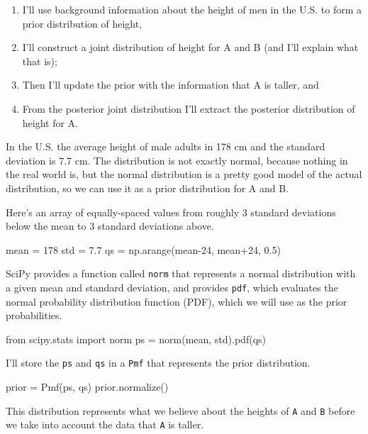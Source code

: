 \documentclass[12pt]{book}
\theoremstyle{exercise}
\newcommand{\py}[1]{{\tt #1}}%
\begin{document}
\begin{enumerate}

\item I'll use background information about the height of men in the U.S. to form a prior distribution of height,

\item I'll construct a joint distribution of height for A and B (and I'll explain what that is);

\item Then I'll update the prior with the information that A is taller, and

\item From the posterior joint distribution I'll extract the posterior distribution of height for A.

\end{enumerate}

In the U.S. the average height of male adults in 178 cm and the standard deviation is 7.7 cm.  The distribution is not exactly normal, because nothing in the real world is, but the normal distribution is a pretty good model of the actual distribution, so we can use it as a prior distribution for A and B.

Here's an array of equally-spaced values from roughly 3 standard deviations below the mean to 3 standard deviations above.

\begin{code}
mean = 178
std = 7.7
qs = np.arange(mean-24, mean+24, 0.5)
\end{code}

SciPy provides a function called \py{norm} that represents a normal distribution with a given mean and standard deviation, and provides \py{pdf}, which evaluates the normal probability distribution function (PDF), which we will use as the prior probabilities.

\begin{code}
from scipy.stats import norm
ps = norm(mean, std).pdf(qs)
\end{code}

I'll store the \py{ps} and \py{qs} in a \py{Pmf} that represents the prior distribution.

\begin{code}
prior = Pmf(ps, qs)
prior.normalize()
\end{code}

This distribution represents what we believe about the heights of \py{A} and \py{B} before we take into account the data that \py{A} is taller.
\end{document}
